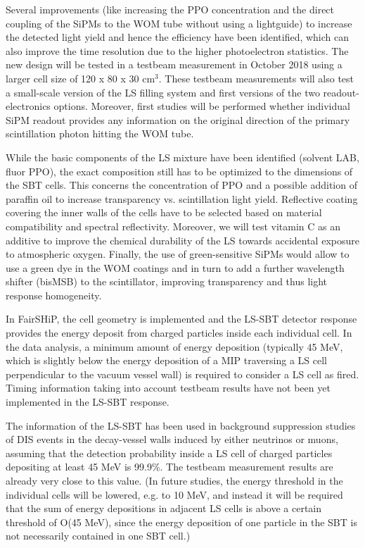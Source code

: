 Several improvements (like increasing the PPO concentration and the direct coupling of the SiPMs to the WOM tube without using a lightguide) to increase the detected light yield and hence the efficiency have been identified, which can also improve the time resolution due to the higher photoelectron statistics. The new design will be tested in a testbeam measurement in October 2018 using a larger cell size of 120 x 80 x 30 cm$^3$. These testbeam measurements will also test a small-scale version of the LS filling system and first versions of the two readout-electronics options. Moreover, first studies will be performed whether individual SiPM readout provides any information on the original direction of the primary scintillation photon hitting the WOM tube.

While the basic components of the LS mixture have been identified (solvent LAB, fluor PPO), the exact composition still has to be optimized to the dimensions of the SBT cells. This concerns the concentration of PPO and a possible addition of paraffin oil to increase transparency vs. scintillation light yield. Reflective coating covering the inner walls of the cells have to be selected based on material compatibility and spectral reflectivity. Moreover, we will test vitamin C as an additive to improve the chemical durability of the LS towards accidental exposure to atmospheric oxygen. Finally, the use of green-sensitive SiPMs would allow to use a green dye in the WOM coatings and in turn to add a further wavelength shifter (bisMSB) to the scintillator, improving transparency and thus light response homogeneity. 

In FairSHiP, the cell geometry is implemented and the LS-SBT detector response provides the energy deposit from charged particles inside each individual cell. In the data analysis, a minimum amount of energy deposition (typically 45 MeV, which is slightly below the energy deposition of a MIP traversing a LS cell perpendicular to the vacuum vessel wall) is required to consider a LS cell as fired. Timing information taking into account testbeam results have not been yet implemented in the LS-SBT response.

The information of the LS-SBT has been used in background suppression studies of DIS events in the decay-vessel walls induced by either neutrinos or muons, assuming that the detection probability inside a LS cell of charged particles depositing at least 45 MeV is 99.9\%. The testbeam measurement results are already very close to this value. (In future studies, the energy threshold in the individual cells will be lowered, e.g. to 10 MeV, and instead it will be required that the sum of energy depositions in adjacent LS cells is above a certain threshold of O(45 MeV), since the energy deposition of one particle in the SBT is not necessarily contained in one SBT cell.)

